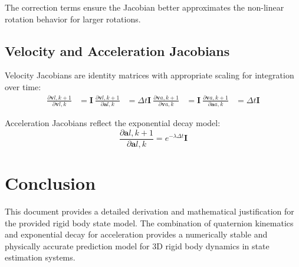 \documentclass{article}
\begin{document}
The correction terms ensure the Jacobian better approximates the non-linear rotation behavior for larger rotations.
\subsection{Velocity and Acceleration Jacobians}
Velocity Jacobians are identity matrices with appropriate scaling for integration over time:
\begin{align*}
	\frac{\partial \mathbf{v}{l,k+1}}{\partial \mathbf{v}{l,k}} &= \mathbf{I} \
	\frac{\partial \mathbf{v}{l,k+1}}{\partial \mathbf{a}{l,k}} &= \Delta t \mathbf{I} \
	\frac{\partial \mathbf{v}{a,k+1}}{\partial \mathbf{v}{a,k}} &= \mathbf{I} \
	\frac{\partial \mathbf{v}{a,k+1}}{\partial \mathbf{a}{a,k}} &= \Delta t \mathbf{I}
\end{align*}

Acceleration Jacobians reflect the exponential decay model:
\begin{equation}
	\frac{\partial \mathbf{a}{l,k+1}}{\partial \mathbf{a}{l,k}} = e^{-\lambda \Delta t} \mathbf{I}
\end{equation}


	\section{Conclusion}
	This document provides a detailed derivation and mathematical justification for the provided rigid body state model. The combination of quaternion kinematics and exponential decay for acceleration provides a numerically stable and physically accurate prediction model for 3D rigid body dynamics in state estimation systems.
\end{document}
